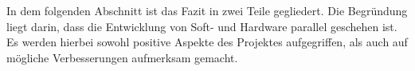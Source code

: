 \label{Projektbeschreibung}

In dem folgenden Abschnitt ist das Fazit in zwei Teile gegliedert. Die Begründung liegt darin, dass die Entwicklung von Soft- und Hardware parallel geschehen ist. Es werden hierbei sowohl positive Aspekte des Projektes aufgegriffen, als auch auf mögliche Verbesserungen aufmerksam gemacht.